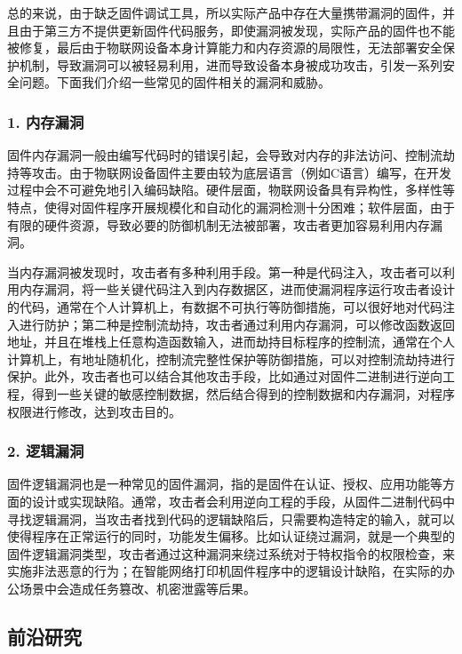 总的来说，由于缺乏固件调试工具，所以实际产品中存在大量携带漏洞的固件，并且由于第三方不提供更新固件代码服务，即使漏洞被发现，实际产品的固件也不能被修复，最后由于物联网设备本身计算能力和内存资源的局限性，无法部署安全保护机制，导致漏洞可以被轻易利用，进而导致设备本身被成功攻击，引发一系列安全问题。下面我们介绍一些常见的固件相关的漏洞和威胁。


\subsubsection{\textcolor{myblue}{\textbf{1. 内存漏洞 }}}
固件内存漏洞一般由编写代码时的错误引起，会导致对内存的非法访问、控制流劫持等攻击。由于物联网设备固件主要由较为底层语言（例如C语言）编写，在开发过程中会不可避免地引入编码缺陷。硬件层面，物联网设备具有异构性，多样性等特点，使得对固件程序开展规模化和自动化的漏洞检测十分困难；软件层面，由于有限的硬件资源，导致必要的防御机制无法被部署，攻击者更加容易利用内存漏洞\cite{SecSurvey}。

当内存漏洞被发现时，攻击者有多种利用手段。第一种是代码注入\cite{InjectRobot}，攻击者可以利用内存漏洞，将一些关键代码注入到内存数据区，进而使漏洞程序运行攻击者设计的代码，通常在个人计算机上，有数据不可执行等防御措施，可以很好地对代码注入进行防护；第二种是控制流劫持\cite{muRAI}，攻击者通过利用内存漏洞，可以修改函数返回地址，并且在堆栈上任意构造函数输入，进而劫持目标程序的控制流，通常在个人计算机上，有地址随机化，控制流完整性保护等防御措施，可以对控制流劫持进行保护。此外，攻击者也可以结合其他攻击手段，比如通过对固件二进制进行逆向工程，得到一些关键的敏感控制数据，然后结合得到的控制数据和内存漏洞，对程序权限进行修改，达到攻击目的。

\subsubsection{\textcolor{myblue}{\textbf{2. 逻辑漏洞 }}}
固件逻辑漏洞也是一种常见的固件漏洞，指的是固件在认证、授权、应用功能等方面的设计或实现缺陷。通常，攻击者会利用逆向工程的手段，从固件二进制代码中寻找逻辑漏洞，当攻击者找到代码的逻辑缺陷后，只需要构造特定的输入，就可以使得程序在正常运行的同时，功能发生偏移。比如认证绕过漏洞\cite{PriviSep}，就是一个典型的固件逻辑漏洞类型，攻击者通过这种漏洞来绕过系统对于特权指令的权限检查，来实施非法恶意的行为；在智能网络打印机固件程序中的逻辑设计缺陷，在实际的办公场景中会造成任务篡改、机密泄露等后果\cite{ExpPrinter}。


\subsection{前沿研究}

